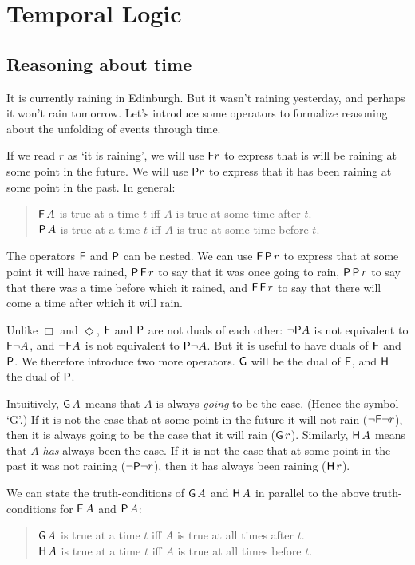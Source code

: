 \chapter{Temporal Logic}\label{ch:time}

\section{Reasoning about time}\label{sec:time-intro}

It is currently raining in Edinburgh. But it wasn't raining yesterday, and
perhaps it won't rain tomorrow. Let's introduce some operators to formalize
reasoning about the unfolding of events through time.

If we read $r$ as `it is raining', we will use $\operatorname{\mathsf{F}}\! r$ to express that is will be
raining at some point in the future. We will use $\operatorname{\mathsf{P}}\! r$ to express that it has been
raining at some point in the past. In general:
%
\begin{quote}
  $\operatorname{\mathsf{F}} A$ is true at a time $t$ iff $A$ is true at some time after $t$.\\
  $\operatorname{\mathsf{P}} A$ is true at a time $t$ iff $A$ is true at some time before $t$.
\end{quote}

The operators $\operatorname{\mathsf{F}}$ and $\operatorname{\mathsf{P}}$ can be nested. We can use $\operatorname{\mathsf{F}} \operatorname{\mathsf{P}} r$ to express
that at some point it will have rained, $\operatorname{\mathsf{P}}\operatorname{\mathsf{F}} r$ to say that it was once going
to rain, $\operatorname{\mathsf{P}}\operatorname{\mathsf{P}} r$ to say that there was a time before which it rained, and
$\operatorname{\mathsf{F}}\operatorname{\mathsf{F}} r$ to say that there will come a time after which it will rain.

Unlike $\Box$ and $\Diamond$, $\operatorname{\mathsf{F}}$ and $\operatorname{\mathsf{P}}$ are not duals of each other:
$\neg \!\operatorname{\mathsf{P}}\! A$ is not equivalent to $\operatorname{\mathsf{F}} \!\neg A$, and $\neg \!\operatorname{\mathsf{F}}\! A$ is not
equivalent to $\operatorname{\mathsf{P}} \!\neg A$. But it is useful to have duals of $\operatorname{\mathsf{F}}$ and $\operatorname{\mathsf{P}}$.
We therefore introduce two more operators. $\operatorname{\mathsf{G}}$ will be the dual of $\operatorname{\mathsf{F}}$, and
$\operatorname{\mathsf{H}}$ the dual of $\operatorname{\mathsf{P}}$.

Intuitively, $\operatorname{\mathsf{G}} A$ means that $A$ is always \emph{going} to be the case.
(Hence the symbol `G'.) If it is not the case that at some point in the future
it will not rain ($\neg \!\operatorname{\mathsf{F}}\! \neg r$), then it is always going to be the case
that it will rain ($\operatorname{\mathsf{G}} r$). Similarly, $\operatorname{\mathsf{H}} A$ means that $A$ \emph{has} always
been the case. If it is not the case that at some point in the past it was not
raining ($\neg \!\operatorname{\mathsf{P}}\! \neg r$), then it has always been raining ($\operatorname{\mathsf{H}} r$).

We can state the truth-conditions of $\operatorname{\mathsf{G}} A$ and $\operatorname{\mathsf{H}} A$ in parallel to the
above truth-conditions for $\operatorname{\mathsf{F}} A$ and $\operatorname{\mathsf{P}} A$:
\begin{quote}
  $\operatorname{\mathsf{G}} A$ is true at a time $t$ iff $A$ is true at all times after $t$.\\
  $\operatorname{\mathsf{H}} A$ is true at a time $t$ iff $A$ is true at all times before $t$.
\end{quote}

